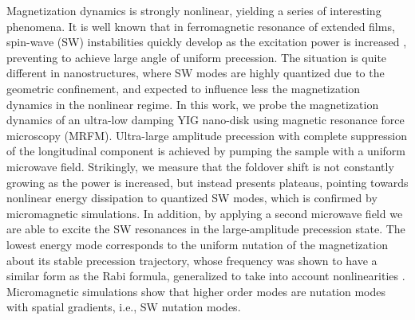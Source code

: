 Magnetization dynamics is strongly nonlinear, yielding a series of interesting phenomena. It is well known that in ferromagnetic resonance of extended films, spin-wave (SW) instabilities quickly develop as the excitation power is increased \cite{Suhl_1957}, preventing to achieve large angle of uniform precession. The situation is quite different in nanostructures, where SW modes are highly quantized due to the geometric confinement, and expected to influence less the magnetization dynamics in the nonlinear regime. In this work, we probe the magnetization dynamics of an ultra-low damping YIG nano-disk \cite{Hahn_2014} using magnetic resonance force microscopy (MRFM). Ultra-large amplitude precession with complete suppression of the longitudinal component is achieved by pumping the sample with a uniform microwave field. Strikingly, we measure that the foldover shift is not constantly growing as the power is increased, but instead presents plateaus, pointing towards nonlinear energy dissipation to quantized SW modes, which is confirmed by micromagnetic simulations. In addition, by applying a second microwave field we are able to excite the SW resonances in the large-amplitude precession state. The lowest energy mode corresponds to the uniform nutation of the magnetization about its stable precession trajectory, whose frequency was shown to have a similar form as the Rabi formula, generalized to take into account nonlinearities \cite{Bertotti_2001}. Micromagnetic simulations show that higher order modes are nutation modes with spatial gradients, i.e., SW nutation modes.